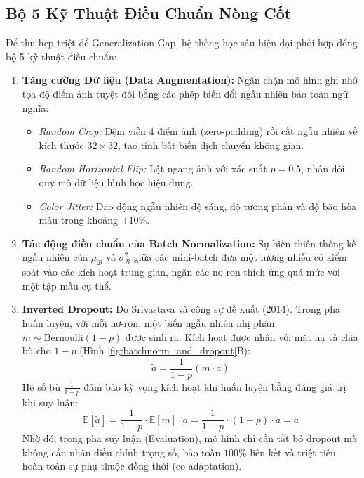 \documentclass[12pt,a4paper]{report}
\begin{document}
\subsection{Bộ 5 Kỹ Thuật Điều Chuẩn Nòng Cốt}
Để thu hẹp triệt để Generalization Gap, hệ thống học sâu hiện đại phối hợp đồng bộ 5 kỹ thuật điều chuẩn:
\begin{enumerate}[leftmargin=*]
    \item \textbf{Tăng cường Dữ liệu (Data Augmentation):} Ngăn chặn mô hình ghi nhớ tọa độ điểm ảnh tuyệt đối bằng các phép biến đổi ngẫu nhiên bảo toàn ngữ nghĩa:
    \begin{itemize}[leftmargin=1.5em]
        \item \textit{Random Crop:} Đệm viền 4 điểm ảnh (zero-padding) rồi cắt ngẫu nhiên về kích thước $32 \times 32$, tạo tính bất biến dịch chuyển không gian.
        \item \textit{Random Horizontal Flip:} Lật ngang ảnh với xác suất $p=0.5$, nhân đôi quy mô dữ liệu hình học hiệu dụng.
        \item \textit{Color Jitter:} Dao động ngẫu nhiên độ sáng, độ tương phản và độ bão hòa màu trong khoảng $\pm 10\%$.
    \end{itemize}
    \item \textbf{Tác động điều chuẩn của Batch Normalization:} Sự biến thiên thống kê ngẫu nhiên của $\mu_{\mathcal{B}}$ và $\sigma^2_{\mathcal{B}}$ giữa các mini-batch đưa một lượng nhiễu có kiểm soát vào các kích hoạt trung gian, ngăn các nơ-ron thích ứng quá mức với một tập mẫu cụ thể.
    \item \textbf{Inverted Dropout:} Do Srivastava và cộng sự đề xuất (2014). Trong pha huấn luyện, với mỗi nơ-ron, một biến ngẫu nhiên nhị phân $m \sim \text{Bernoulli}(1-p)$ được sinh ra. Kích hoạt được nhân với mặt nạ và chia bù cho $1-p$ (Hình \ref{fig:batchnorm_and_dropout}B):
    \begin{equation}
        \widetilde{a} = \frac{1}{1 - p} (m \cdot a)
    \end{equation}
    Hệ số bù $\frac{1}{1-p}$ đảm bảo kỳ vọng kích hoạt khi huấn luyện bằng đúng giá trị khi suy luận:
    \begin{equation}
        \mathbb{E}[\widetilde{a}] = \frac{1}{1 - p} \cdot \mathbb{E}[m] \cdot a = \frac{1}{1 - p} \cdot (1 - p) \cdot a = a
    \end{equation}
    Nhờ đó, trong pha suy luận (Evaluation), mô hình chỉ cần tắt bỏ dropout mà không cần nhân điều chỉnh trọng số, bảo toàn $100\%$ liên kết và triệt tiêu hoàn toàn sự phụ thuộc đồng thời (co-adaptation).

\end{enumerate}
\end{document}
